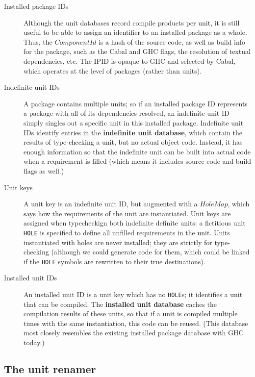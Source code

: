 \documentclass{article}
\newcommand{\I}[1]{\ensuremath{\mathit{#1}}}
\begin{document}
\begin{description} \item[Installed package IDs]  Although the unit
databases record compile products per unit, it is still useful to be
able to assign an identifier to an installed package as a whole.  Thus,
the \I{ComponentId} is a hash of the source code, as well as
build info for the package, such as the Cabal and GHC flags, the
resolution of textual dependencies, etc.  The IPID is opaque to GHC
and selected by Cabal, which operates at the level of packages (rather
than units).

\item[Indefinite unit IDs]  A package contains multiple units; so if an
installed package ID represents a package with all of its dependencies
resolved, an indefinite unit ID simply singles out a specific unit in
this installed package.  Indefinite unit IDs identify entries in the
\textbf{indefinite unit database}, which contain the results of
type-checking a unit, but no actual object code. Instead, it has enough
information so that the indefinite unit can be built into actual code
when a requirement is filled (which means it includes source code and
build flags as well.)

\item[Unit keys]  A unit key is an indefinite unit ID, but augmented
with a \I{HoleMap}, which says how the requirements of the unit are
instantiated.  Unit keys are assigned when typecheckign both indefinite
definite units:  a fictitious unit \verb|HOLE| is specified to define
all unfilled requirements in the unit.  Units instantiated with holes
are never installed; they are strictly for type-checking (although
we could generate code for them, which could be linked if the
\verb|HOLE| symbols are rewritten to their true destinations).

\item[Installed unit IDs]  An installed unit ID is a unit key which has
no \verb|HOLE|s; it identifies a unit that can be compiled.  The
\textbf{installed unit database} caches the compilation results of these
units, so that if a unit is compiled multiple times with the same
instantiation, this code can be reused. (This database most closely
resembles the existing installed package database with GHC today.)
\end{description}

\subsection{The unit renamer}
\end{document}
